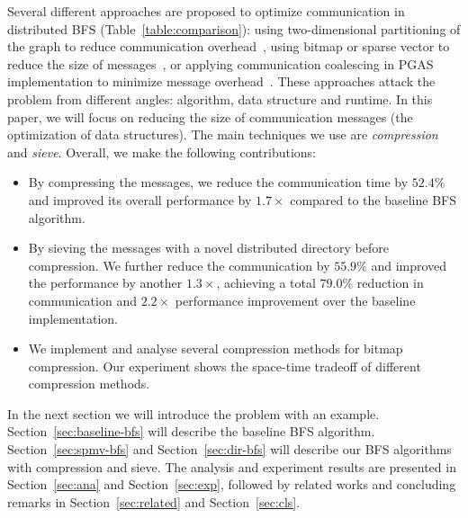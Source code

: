 \documentclass[conference]{IEEEtran}
\begin{document}
Several different approaches are proposed to optimize communication in
distributed BFS (Table~\ref{table:comparison}): using two-dimensional
partitioning of the graph to reduce communication
overhead~\cite{Yoo:2005,Buluc:2011}, using bitmap or sparse vector to reduce
the size of messages~\cite{graph500,Buluc:2011}, or applying communication
coalescing in PGAS implementation to minimize message
overhead~\cite{Cong:2010}. These approaches attack the problem from different
angles: algorithm, data structure and runtime. In this paper, we will focus on
reducing the size of communication messages (the optimization of data
structures).  The main techniques we use are \emph{compression} and
\emph{sieve}. Overall, we make the following contributions:
\begin{itemize}
\item By compressing the messages, we reduce the communication time by $52.4\%$
  and improved its overall performance by $1.7\times$ compared to the baseline BFS
  algorithm. 
\item By sieving the messages with a novel distributed directory before
  compression. We further reduce the communication by $55.9\%$ and improved the
  performance by another $1.3 \times$, achieving a total $79.0\%$ reduction in
  communication and $2.2 \times$ performance improvement over the baseline
  implementation. 
\item We implement and analyse several compression methods for bitmap
  compression. Our experiment shows the space-time tradeoff of different
  compression methods. 
\end{itemize}

In the next section we will introduce the problem with an
example. Section~\ref{sec:baseline-bfs} will describe the baseline BFS
algorithm. Section~\ref{sec:spmv-bfs} and Section~\ref{sec:dir-bfs} will
describe our BFS algorithms with compression and sieve. The analysis and
experiment results are presented in Section~\ref{sec:ana} and
Section~\ref{sec:exp}, followed by related works and concluding remarks in
Section~\ref{sec:related} and Section~\ref{sec:cls}.
\end{document}
